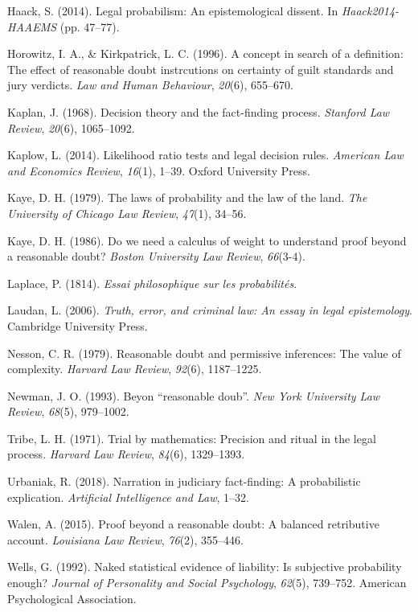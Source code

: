 \documentclass[10pt,dvipsnames,enabledeprecatedfontcommands]{scrartcl}
\begin{document}
\hypertarget{ref-haack2011legal}{}
Haack, S. (2014). Legal probabilism: An epistemological dissent. In
\emph{Haack2014-HAAEMS} (pp. 47--77).

\hypertarget{ref-Horowitz1996}{}
Horowitz, I. A., \& Kirkpatrick, L. C. (1996). A concept in search of a
definition: The effect of reasonable doubt instrcutions on certainty of
guilt standards and jury verdicts. \emph{Law and Human Behaviour},
\emph{20}(6), 655--670.

\hypertarget{ref-Kaplan1968decision}{}
Kaplan, J. (1968). Decision theory and the fact-finding process.
\emph{Stanford Law Review}, \emph{20}(6), 1065--1092.

\hypertarget{ref-kaplow2014likelihood}{}
Kaplow, L. (2014). Likelihood ratio tests and legal decision rules.
\emph{American Law and Economics Review}, \emph{16}(1), 1--39. Oxford
University Press.

\hypertarget{ref-kaye79}{}
Kaye, D. H. (1979). The laws of probability and the law of the land.
\emph{The University of Chicago Law Review}, \emph{47}(1), 34--56.

\hypertarget{ref-kaye1986we}{}
Kaye, D. H. (1986). Do we need a calculus of weight to understand proof
beyond a reasonable doubt? \emph{Boston University Law Review},
\emph{66}(3-4).

\hypertarget{ref-Laplace1814}{}
Laplace, P. (1814). \emph{Essai philosophique sur les probabilités}.

\hypertarget{ref-laudan2006truth}{}
Laudan, L. (2006). \emph{Truth, error, and criminal law: An essay in
legal epistemology}. Cambridge University Press.

\hypertarget{ref-Nesson1979Reasonable-doub}{}
Nesson, C. R. (1979). Reasonable doubt and permissive inferences: The
value of complexity. \emph{Harvard Law Review}, \emph{92}(6),
1187--1225.

\hypertarget{ref-newman1993}{}
Newman, J. O. (1993). Beyon ``reasonable doub''. \emph{New York
University Law Review}, \emph{68}(5), 979--1002.

\hypertarget{ref-tribe71}{}
Tribe, L. H. (1971). Trial by mathematics: Precision and ritual in the
legal process. \emph{Harvard Law Review}, \emph{84}(6), 1329--1393.

\hypertarget{ref-urbaniak2018narration}{}
Urbaniak, R. (2018). Narration in judiciary fact-finding: A
probabilistic explication. \emph{Artificial Intelligence and Law},
1--32.

\hypertarget{ref-walen2015}{}
Walen, A. (2015). Proof beyond a reasonable doubt: A balanced
retributive account. \emph{Louisiana Law Review}, \emph{76}(2),
355--446.

\hypertarget{ref-wells1992naked}{}
Wells, G. (1992). Naked statistical evidence of liability: Is subjective
probability enough? \emph{Journal of Personality and Social Psychology},
\emph{62}(5), 739--752. American Psychological Association.
\end{document}
